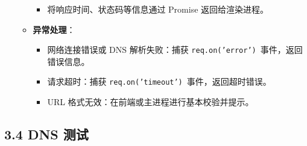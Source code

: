 \documentclass{article}
\begin{document}
\begin{itemize}
\begin{itemize}
\begin{itemize}
            \item 将响应时间、状态码等信息通过 Promise 返回给渲染进程。
        \end{itemize}
        \item \textbf{异常处理}：
        \begin{itemize}
            \item 网络连接错误或 DNS 解析失败：捕获 \texttt{req.on('error')}\ 事件，返回错误信息。
            \item 请求超时：捕获 \texttt{req.on('timeout')}\ 事件，返回超时错误。
            \item URL 格式无效：在前端或主进程进行基本校验并提示。
        \end{itemize}
    \end{itemize}
\end{itemize}

\subsection*{3.4 DNS 测试}
\end{document}
